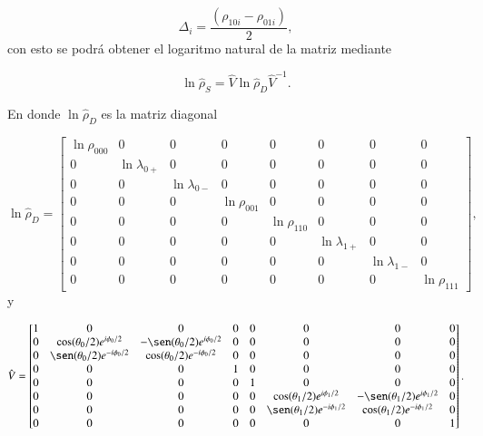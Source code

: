 \begin{appendixs}
\begin{equation*}
    \Delta_{i} = \frac{(\rho_{10i} - \rho_{01i})}{2},
\end{equation*}
con esto se podrá obtener el logaritmo natural de la matriz mediante

\begin{equation*}
    \ln \hat{\rho}_{S} = \hat{V}\ln \hat{\rho}_{D} \hat{V}^{-1}.
\end{equation*}
    
En donde $\ln \hat{\rho}_{D}$ es la matriz diagonal 

\begin{equation*}
    \ln \hat{\rho}_{D} = 
    \begin{bmatrix}
        \ln \rho_{000} & 0 & 0 & 0 & 0 & 0 & 0 & 0 \\
        0 & \ln \lambda_{0+} & 0 & 0 & 0 & 0 & 0 & 0 \\
        0 & 0 & \ln \lambda_{0-} & 0 & 0 & 0 & 0 & 0 \\
        0 & 0 & 0 & \ln \rho_{001} & 0 & 0 & 0 & 0 \\
        0 & 0 & 0 & 0 & \ln \rho_{110} & 0 & 0 & 0 \\
        0 & 0 & 0 & 0 & 0 & \ln \lambda_{1+} & 0 & 0 \\
        0 & 0 & 0 & 0 & 0 & 0 & \ln \lambda_{1-} & 0 \\
        0 & 0 & 0 & 0 & 0 & 0 & 0 & \ln \rho_{111} 
        \end{bmatrix},
\end{equation*}
y 

\begin{equation*}
    \hat{V} = 
    \begin{bmatrix}
        1 & 0 & 0 & 0 & 0 & 0 & 0 & 0 \\
        0 & \cos(\theta_{0}/2)e^{i\phi_{0}/2} & -\sen(\theta_{0}/2)e^{i\phi_{0}/2} & 0 & 0 & 0 & 0 & 0 \\
        0 & \sen(\theta_{0}/2)e^{-i\phi_{0}/2} & \cos(\theta_{0}/2)e^{-i\phi_{0}/2} & 0 & 0 & 0 & 0 & 0 \\
        0 & 0 & 0 & 1 & 0 & 0 & 0 & 0 \\
        0 & 0 & 0 & 0 & 1 & 0 & 0 & 0 \\
        0 & 0 & 0 & 0 & 0 &  \cos(\theta_{1}/2)e^{i\phi_{1}/2} & -\sen(\theta_{1}/2)e^{i\phi_{1}/2} & 0 \\
        0 & 0 & 0 & 0 & 0 & \sen(\theta_{1}/2)e^{-i\phi_{1}/2} & \cos(\theta_{1}/2)e^{-i\phi_{1}/2} & 0 \\
        0 & 0 & 0 & 0 & 0 & 0 & 0 & 1 
        \end{bmatrix}.
\end{equation*}


\end{appendixs}
